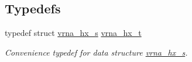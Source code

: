 \subsection*{Typedefs}
\begin{DoxyCompactItemize}
\item 
typedef struct \hyperlink{group__struct__utils_structvrna__hx__s}{vrna\+\_\+hx\+\_\+s} \hyperlink{group__struct__utils_ga877363f3a1703b53ecd025c6fcf897a0}{vrna\+\_\+hx\+\_\+t}\hypertarget{group__struct__utils_ga877363f3a1703b53ecd025c6fcf897a0}{}\label{group__struct__utils_ga877363f3a1703b53ecd025c6fcf897a0}

\begin{DoxyCompactList}\small\item\em Convenience typedef for data structure \hyperlink{group__struct__utils_structvrna__hx__s}{vrna\+\_\+hx\+\_\+s}. \end{DoxyCompactList}\end{DoxyCompactItemize}
